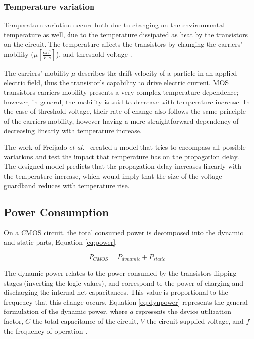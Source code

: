 \subsubsection{Temperature variation}

Temperature variation occurs both due to changing on the environmental temperature as well, due to the temperature dissipated as heat by the transistors on the circuit. The temperature affects the transistors by changing the carriers' mobility ($ \mu [\frac{cm^2}{V\cdot s}]$), and threshold voltage \cite{wolpert_temperature_2012}.

The carriers' mobility $ \mu $ describes the drift velocity of a particle in an applied electric field, thus the transistor's capability to drive electric current. MOS transistors carriers mobility presents a very complex temperature dependence; however, in general, the mobility is said to decrease with temperature increase. In the case of threshold voltage, their rate of change also follows the same principle of the carriers mobility, however having a more straightforward dependency of decreasing linearly with temperature increase.

The work of Freijado \textit{et al.}~\cite{freijedo_modeling_2012} created a model that tries to encompass all possible variations and test the impact that temperature has on the propagation delay. The designed model predicts that the propagation delay increases linearly with the temperature increase, which would imply that the size of the voltage guardband reduces with temperature rise. 

\subsection{Power Consumption}
\label{sec:power_consumption}
On a CMOS circuit, the total consumed power is decomposed into the dynamic and static parts, Equation \ref{eq:power}.

\begin{equation}
    P_{CMOS} = P_{dynamic} + P_{static}
    \label{eq:power}
\end{equation}

The dynamic power relates to the power consumed by the transistors flipping stages (inverting the logic values), and correspond to the power of charging and discharging the internal net capacitances. This value is proportional to the frequency that this change occurs. Equation \ref{eq:dynpower} represents the general formulation of the dynamic power, where $a$ represents the device utilization factor, $C$ the total capacitance of the circuit, $V$ the circuit supplied voltage, and $f$ the frequency of operation \cite{gonzalez_supply_1997}.


